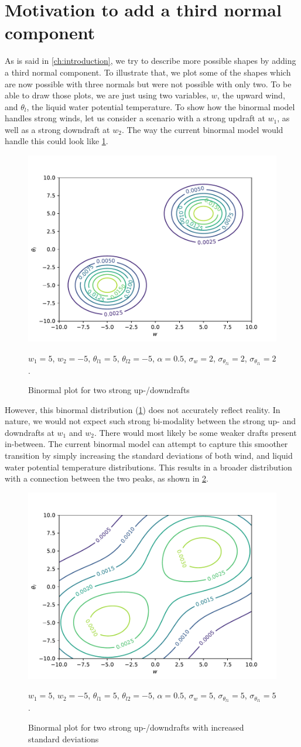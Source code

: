 \section{Motivation to add a third normal component}
\label{sec:motivation-to-add-a-third-normal-component}

As is said in \cref{ch:introduction},
we try to describe more possible shapes by adding a third normal component.
To illustrate that, we plot some of the shapes which are now possible with three normals
but were not possible with only two.
To be able to draw those plots, we are just using two variables, $w$, the upward wind,
and $\theta_l$, the liquid water potential temperature.
To show how the binormal model handles strong winds,
let us consider a scenario with a strong updraft at $w_1$, as well as a strong downdraft at $w_2$.
The way the current binormal model would handle this could look like \cref{fig:plot1}.
\begin{figure}[!htb]
    \centering
    \includegraphics[width=.48\textwidth]{include/figures/plot1}
    \caption{Binormal plot for two strong up-/downdrafts}
    \label{fig:plot1}
    $w_1 = 5$, $w_2 = -5$, $\theta_{l1} = 5$, $\theta_{l2} = -5$,
    $\alpha = 0.5$, $\sigma_w = 2$, $\sigma_{\theta_{l1}} = 2$, $\sigma_{\theta_{l1}} = 2$.
\end{figure}
However, this binormal distribution (\cref{fig:plot1}) does not accurately reflect reality.
In nature, we would not expect such strong bi-modality between the strong up-
and downdrafts at $w_1$ and $w_2$.
There would most likely be some weaker drafts present in-between.
The current binormal model can attempt to capture this smoother transition
by simply increasing the standard deviations of both wind,
and liquid water potential temperature distributions.
This results in a broader distribution with a connection between the two peaks,
as shown in \cref{fig:plot2}.
\begin{figure}[!htb]
    \centering
    \includegraphics[width=.5\textwidth]{include/figures/plot2}
    \caption{Binormal plot for two strong up-/downdrafts with increased standard deviations}
    \label{fig:plot2}
    $w_1 = 5$, $w_2 = -5$, $\theta_{l1} = 5$, $\theta_{l2} = -5$,
    $\alpha = 0.5$, $\sigma_w = 5$, $\sigma_{\theta_{l1}} = 5$, $\sigma_{\theta_{l1}} = 5$.
\end{figure}
